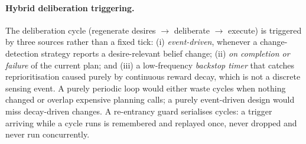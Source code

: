 \paragraph{Hybrid deliberation triggering.}
The deliberation cycle (regenerate desires $\rightarrow$ deliberate $\rightarrow$ execute) is
triggered by three sources rather than a fixed tick: (i) \emph{event-driven}, whenever a
change-detection strategy reports a desire-relevant belief change; (ii) \emph{on completion or
failure} of the current plan; and (iii) a low-frequency \emph{backstop timer} that catches
reprioritisation caused purely by continuous reward decay, which is not a discrete sensing event.
A purely periodic loop would either waste cycles when nothing changed or overlap expensive
planning calls; a purely event-driven design would miss decay-driven changes. A re-entrancy
guard serialises cycles: a trigger arriving while a cycle runs is remembered and replayed once,
never dropped and never run concurrently.
